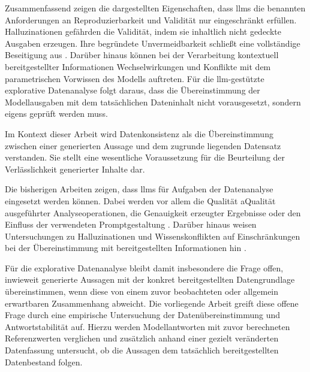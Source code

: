 Zusammenfassend zeigen die dargestellten Eigenschaften, dass \glspl{llm} die benannten Anforderungen an Reproduzierbarkeit und Validität nur eingeschränkt erfüllen. Halluzinationen gefährden die Validität, indem sie inhaltlich nicht gedeckte Ausgaben erzeugen. Ihre begründete Unvermeidbarkeit schließt eine vollständige Beseitigung aus \parencite{xu_hallucination_2025}. Darüber hinaus können bei der Verarbeitung kontextuell bereitgestellter Informationen Wechselwirkungen und Konflikte mit dem parametrischen Vorwissen des Modells auftreten. Für die \gls{llm}-gestützte explorative Datenanalyse folgt daraus, dass die Übereinstimmung der Modellausgaben mit dem tatsächlichen Dateninhalt nicht vorausgesetzt, sondern eigens geprüft werden muss. 

Im Kontext dieser Arbeit wird Datenkonsistenz als die Übereinstimmung zwischen einer generierten Aussage und dem zugrunde liegenden Datensatz verstanden. Sie stellt eine wesentliche Voraussetzung für die Beurteilung der Verlässlichkeit generierter Inhalte dar. 

Die bisherigen Arbeiten zeigen, dass \glspl{llm} für Aufgaben der Datenanalyse eingesetzt werden können. Dabei werden vor allem die Qualität aQualität ausgeführter Analyseoperationen, die Genauigkeit erzeugter Ergebnisse oder den Einfluss der verwendeten Promptgestaltung \parencite{cheng_gpt_2023, li_tapilot-crossing_2024, zhecheva_exploratory_2024}. Darüber hinaus weisen Untersuchungen zu Halluzinationen und Wissenskonflikten auf Einschränkungen bei der Übereinstimmung mit bereitgestellten Informationen hin \parencite{bai_hallucination_2025, wang_resolving_2024}.

Für die explorative Datenanalyse bleibt damit insbesondere die Frage offen, inwieweit generierte Aussagen mit der konkret bereitgestellten Datengrundlage übereinstimmen, wenn diese von einem zuvor beobachteten oder allgemein erwartbaren Zusammenhang abweicht. Die vorliegende Arbeit greift diese offene Frage durch eine empirische Untersuchung der Datenübereinstimmung und Antwortstabilität auf. Hierzu werden Modellantworten mit zuvor berechneten Referenzwerten verglichen und zusätzlich anhand einer gezielt veränderten Datenfassung untersucht, ob die Aussagen dem tatsächlich bereitgestellten Datenbestand folgen.



